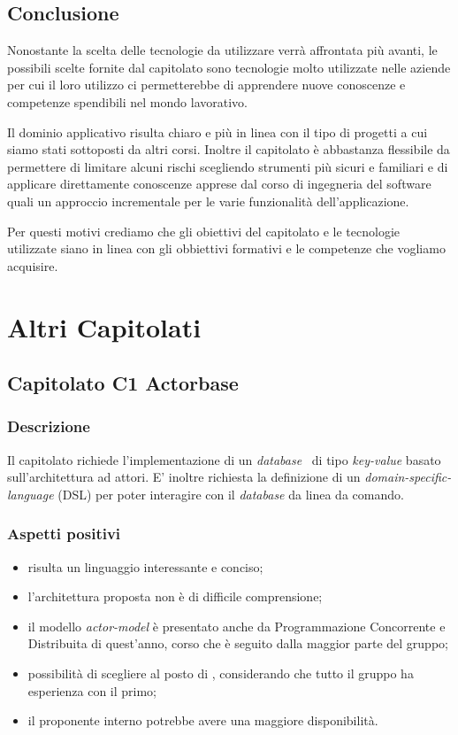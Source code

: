 \documentclass[12pt,a4paper]{article}
\begin{document}
\subsection{Conclusione}

Nonostante la scelta delle tecnologie da utilizzare verrà affrontata più avanti, le possibili scelte fornite dal capitolato sono tecnologie molto utilizzate nelle aziende per cui il loro utilizzo ci permetterebbe di apprendere nuove conoscenze e competenze spendibili nel mondo lavorativo.

Il dominio applicativo risulta chiaro e più in linea con il tipo di progetti a cui siamo stati sottoposti da altri corsi. Inoltre il capitolato è abbastanza flessibile da permettere di limitare alcuni rischi scegliendo strumenti più sicuri e familiari e di applicare direttamente conoscenze apprese dal corso di ingegneria del software quali un approccio incrementale per le varie funzionalità dell'applicazione.

Per questi motivi crediamo che gli obiettivi del capitolato e le tecnologie utilizzate siano in linea con gli obbiettivi formativi e le competenze che vogliamo acquisire.

\newpage
\section{Altri Capitolati}

\subsection{Capitolato C1 Actorbase}
\subsubsection{Descrizione}

Il capitolato richiede l'implementazione di un \textit{database} \ di tipo \textit{key-value} basato sull'architettura ad attori. E' inoltre richiesta la definizione di un \textit{domain-specific-language} (DSL) per poter interagire con il \textit{database} da linea da comando.

\subsubsection{Aspetti positivi}
\begin{itemize}
\item {} risulta un linguaggio interessante e conciso;
\item l'architettura proposta non è di difficile comprensione;
\item il modello \textit{actor-model} è presentato anche da Programmazione Concorrente e Distribuita di quest'anno, corso che è seguito dalla maggior parte del gruppo;
\item possibilità di scegliere  al posto di , considerando che tutto il gruppo ha esperienza con il primo;
\item il proponente interno potrebbe avere una maggiore disponibilità.
\end{itemize}
\end{document}
